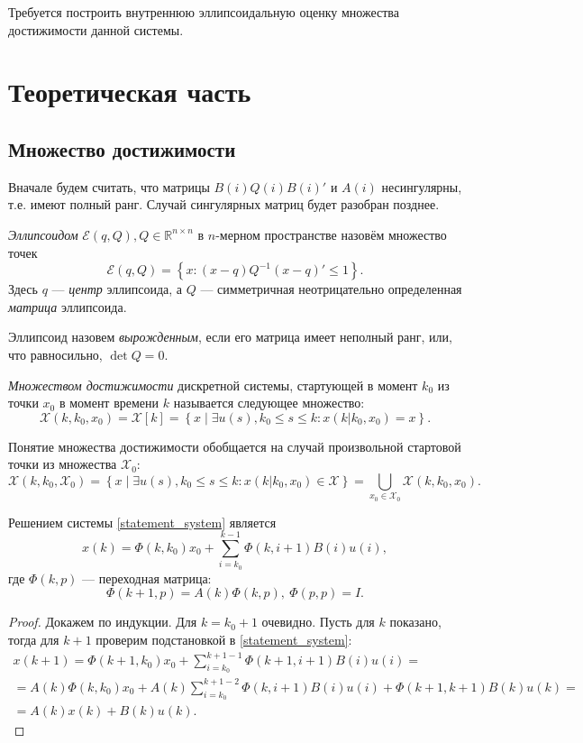 \documentclass[10pt, a4paper]{article}
\renewcommand{\ell}{\mathcal{E}}
\begin{document}
Требуется построить внутреннюю эллипсоидальную оценку множества достижимости данной системы.

\section{Теоретическая часть}
\subsection{Множество достижимости}
Вначале будем считать, что матрицы $B(i)Q(i)B(i)'$ и $A(i)$ несингулярны, т.е. имеют полный ранг. Случай сингулярных матриц будет разобран позднее.
\begin{df}
\textit{Эллипсоидом} $\ell(q,Q), Q\in\mathbb{R}^{n\times n}$ в $n$-мерном пространстве назовём множество точек
\[ \ell(q,Q) = \left\{ x\colon (x-q)Q^{-1}(x-q)' \leqslant 1 \right\}. \]
Здесь $q$ --- \textit{центр} эллипсоида, а $Q$ --- симметричная неотрицательно определенная \textit{матрица} эллипсоида. 
\end{df}
Эллипсоид назовем \textit{вырожденным}, если его матрица имеет неполный ранг, или, что равносильно, $\det Q = 0$.
\begin{df}
\textit{Множеством достижимости} дискретной системы, стартующей в момент $k_0$ из точки $x_0$ в момент времени $k$ называется следующее множество:
\[ \mathcal{X}(k,k_0,x_0) = \mathcal{X}[k] = \left\{ x \middle| \exists u(s), k_0\leqslant s\leqslant k\colon x(k|k_0,x_0)=x \right\}.\]
\end{df}
Понятие множества достижимости обобщается на случай произвольной стартовой точки из множества $\mathcal{X}_0$:
\[ \mathcal{X}(k,k_0,\mathcal{X}_0) = \left\{ x \middle| \exists u(s), k_0\leqslant s\leqslant k\colon x(k|k_0,x_0)\in \mathcal{X} \right\} = \bigcup\limits_{x_0\in\mathcal{X}_0}\mathcal{X}(k,k_0,x_0).\]
\begin{theorem}
Решением системы \eqref{statement_system} является 
\begin{equation}\label{solution}
	x(k) = \Phi(k,k_0)x_0 + \sum\limits_{i=k_0}^{k-1}\Phi(k,i+1)B(i)u(i),
\end{equation} 
где $\Phi(k,p)$ --- переходная матрица:
\begin{equation}\label{solution}
	\Phi(k+1,p) = A(k)\Phi(k,p),\ \Phi(p,p)=I.
\end{equation}
\end{theorem}
\begin{proof}
	Докажем по индукции. Для $k=k_0+1$ очевидно. Пусть для $k$ показано, тогда для $k+1$
	проверим подстановкой в \eqref{statement_system}:
	\begin{gather*}
		{x}(k+1) = \Phi(k+1,k_0)x_0 + \sum\limits_{i=k_0}^{k+1-1}\Phi(k+1,i+1)B(i)u(i) = 
		\\ = A(k)\Phi(k,k_0)x_0 + A(k)\sum\limits_{i=k_0}^{k+1-2}\Phi(k,i+1)B(i)u(i) + 
		\Phi(k+1,k+1)B(k)u(k) = \\ = A(k)x(k) + B(k)u(k).
	\end{gather*}
\end{proof}
\end{document}
